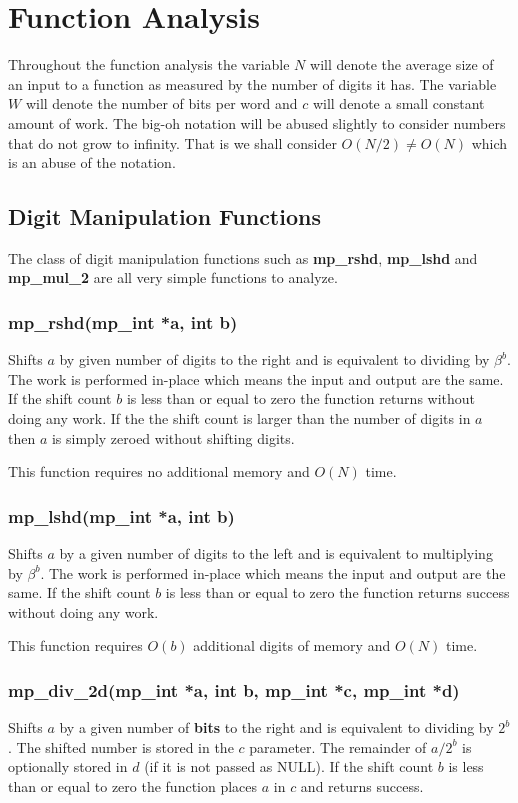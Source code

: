 \documentclass[]{article}
\begin{document}
\section{Function Analysis}

Throughout the function analysis the variable $N$ will denote the average size of an input to a function as measured 
by the number of digits it has.  The variable $W$ will denote the number of bits per word and $c$ will denote a small
constant amount of work.  The big-oh notation will be abused slightly to consider numbers that do not grow to infinity.
That is we shall consider $O(N/2) \ne O(N)$ which is an abuse of the notation.

\subsection{Digit Manipulation Functions}
The class of digit manipulation functions such as \textbf{mp\_rshd}, \textbf{mp\_lshd} and \textbf{mp\_mul\_2} are all
very simple functions to analyze.  

\subsubsection{mp\_rshd(mp\_int *a, int b)}
Shifts $a$ by given number of digits to the right and is equivalent to dividing by $\beta^b$.  The work is performed
in-place which means the input and output are the same.  If the shift count $b$ is less than or equal to zero 
the function returns without doing any work.  If the the shift count is larger than the number of digits in $a$ 
then $a$ is simply zeroed without shifting digits.

This function requires no additional memory and $O(N)$ time.

\subsubsection{mp\_lshd(mp\_int *a, int b)}
Shifts $a$ by a given number of digits to the left and is equivalent to multiplying by $\beta^b$.  The work
is performed in-place which means the input and output are the same.  If the shift count $b$ is less than or equal 
to zero the function returns success without doing any work.

This function requires $O(b)$ additional digits of memory and $O(N)$ time.

\subsubsection{mp\_div\_2d(mp\_int *a, int b, mp\_int *c, mp\_int *d)}
Shifts $a$ by a given number of \textbf{bits} to the right and is equivalent to dividing by $2^b$.  The shifted number is stored
in the $c$ parameter.  The remainder of $a/2^b$ is optionally stored in $d$ (if it is not passed as NULL).  
If the shift count $b$ is less than or equal to zero the function places $a$ in $c$ and returns success.  
\end{document}
